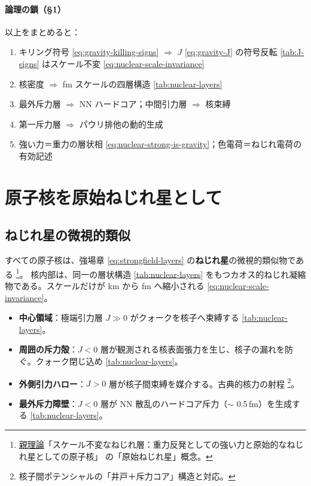 \documentclass[dvipdfmx,a4paper,oneside]{jsbook}
\numberwithin{equation}{chapter}
\begin{document}
\paragraph{論理の鎖（§1）}
以上をまとめると：
\begin{enumerate}[leftmargin=2em]
  \item キリング符号 \eqref{eq:gravity-killing-signs} \(\Rightarrow\) \(J\) \eqref{eq:gravity-J} の符号反転 \eqref{tab:J-signs} はスケール不変 \eqref{eq:nuclear-scale-invariance}
  \item 核密度 \(\Rightarrow\) fm スケールの四層構造 \eqref{tab:nuclear-layers}
  \item 最外斥力層 \(\Rightarrow\) NN ハードコア；中間引力層 \(\Rightarrow\) 核束縛
  \item 第一斥力層 \(\Rightarrow\) パウリ排他の動的生成
  \item 強い力＝重力の層状相 \eqref{eq:nuclear-strong-is-gravity}；色電荷＝ねじれ電荷の有効記述
\end{enumerate}

\section{原子核を原始ねじれ星として}

\subsection{ねじれ星の微視的類似}

すべての原子核は、強場章 \eqref{eq:strongfield-layers} の\textbf{ねじれ星}の微視的類似物である \footnote{\hyperref[sec:sister-manuscripts]{親理論}「スケール不変なねじれ層：重力反発としての強い力と原始的なねじれ星としての原子核」 の「原始ねじれ星」概念。}。
核内部は、同一の層状構造 \eqref{tab:nuclear-layers} をもつカオス的ねじれ凝縮物である。スケールだけが km から fm へ縮小される \eqref{eq:nuclear-scale-invariance}。

\begin{itemize}[leftmargin=2em]
  \item \textbf{中心領域}：極端引力層 \(J \gg 0\) がクォークを核子へ束縛する \eqref{tab:nuclear-layers}。
  \item \textbf{周囲の斥力殻}：\(J < 0\) 層が観測される核表面張力を生じ、核子の漏れを防ぐ。クォーク閉じ込め \eqref{tab:nuclear-layers}。
  \item \textbf{外側引力ハロー}：\(J > 0\) 層が核子間束縛を媒介する。古典的核力の射程 \footnote{核子間ポテンシャルの「井戸＋斥力コア」構造と対応。}。
  \item \textbf{最外斥力障壁}：\(J < 0\) 層が NN 散乱のハードコア斥力（\(\sim\) 0.5\,fm）を生成する \eqref{tab:nuclear-layers}。
\end{itemize}
\end{document}
